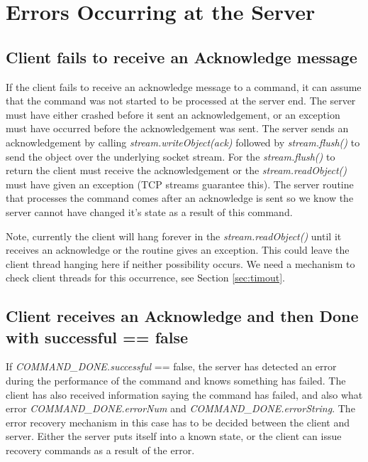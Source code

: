 \documentclass[10pt,a4paper]{article}
\begin{document}
\section{Errors Occurring at the Server}
\subsection{Client fails to receive an Acknowledge message}
If the client fails to receive an acknowledge message to a command, it can assume that the command was not
started to be processed at the server end. The server must have either crashed before it sent an
acknowledgement, or an exception must have occurred before the acknowledgement was sent. The server sends an
acknowledgement by calling {\em stream.writeObject(ack)} followed by {\em stream.flush()} to send the object over
the underlying socket stream. For the {\em stream.flush()} to return the client must receive the acknowledgement
or the {\em stream.readObject()} must have given an exception (TCP streams guarantee this). 
The server routine that processes the command comes after an acknowledge is sent so
we know the server cannot have changed it's state as a result of this command. 

Note, currently the client will hang forever in the {\em stream.readObject()} until it receives an acknowledge
or the routine gives an exception. This could leave the client thread hanging here if neither possibility occurs.
We need a mechanism to check client threads for this occurrence, see Section \ref{sec:timout}.

\subsection{Client receives an Acknowledge and then Done with successful == false}
If {\em COMMAND\_DONE.successful} == false, the server has detected an error during the performance of the 
command and knows
something has failed. The client has also received information saying the command has failed, and also
what error {\em COMMAND\_DONE.errorNum} and {\em COMMAND\_DONE.errorString}. The error
recovery mechanism in this case has to be decided between the client and server. Either the server puts itself
into a known state, or the client can issue recovery commands as a result of the error. 
\end{document}
